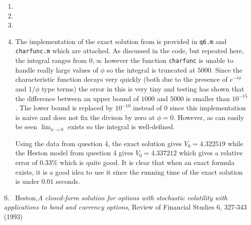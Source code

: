 \documentclass[10pt,english]{article}
\theoremstyle{plain}
\begin{document}
\begin{enumerate}
\begin{enumerate}
\item
\end{enumerate}

\item
\item
\item

\item The implementation of the exact solution from \cite{heston} is provided in \texttt{q6.m} and \texttt{charfunc.m} which are attached. As discussed in the code, but repeated here, the integral ranges from $0,\infty$ however the function \texttt{charfunc} is unable to handle really large values of $\phi$ so the integral is truncated at $5000$. Since the characteristic function decays very quickly (both due to the presence of $e^{-i\phi}$ and $1/\phi$ type terms) the error in this is very tiny and testing has shown that the difference between an upper bound of $1000$ and $5000$ is smaller than $10^{-15}$. The lower bound is replaced by $10^{-10}$ instead of $0$ since this implementation is naive and does not fix the divison by zero at $\phi=0$. However, as can easily be seen $\lim_{\phi\rightarrow 0}$ exists so the integral is well-defined. 

Using the data from question 4, the exact solution gives $V_{0}=4.322519$ while the Heston model from question 4 gives $V_{0}=4.337212$ which gives a relative error of $0.33\%$ which is quite good. It is clear that when an exact formula exists, it is a good idea to use it since the running time of the exact solution is under $0.01$ seconds.
\end{enumerate}
\begin{thebibliography}{1}
 S. ~Heston,\textit{A closed-form solution for options with stochastic volatility with applications to bond and currency options}, Review of Financial Studies 6, 327-343 (1993)
\end{thebibliography}
\end{document}
